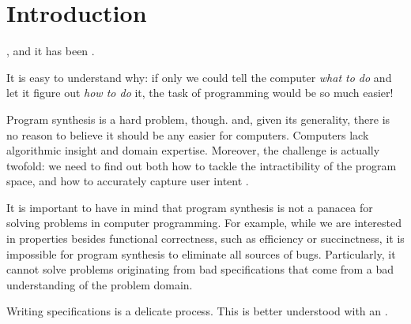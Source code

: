 \chapter{Introduction}
\label{chapter:introduction}


 , and it has been
.

It is easy to understand why: if only we could tell the computer \textit{what to
do} and let it figure out \textit{how to do} it, the task of programming would
be so much easier!

Program synthesis is a hard problem, though.  and, given its generality,
there is no reason to believe it should be any easier for computers. Computers
lack algorithmic insight and domain expertise. Moreover, the challenge is
actually twofold: we need to find out both how to tackle the intractibility of
the program space, and how to accurately capture user intent \cite{Gulwani2017}.


It is important to have in mind that program synthesis is not a panacea for
solving problems in computer programming. For example, while we are interested
in properties besides functional correctness, such as efficiency or
succinctness, it is impossible for program synthesis to eliminate all sources of
bugs. Particularly, it cannot solve problems originating from bad specifications
that come from a bad understanding of the problem domain.

Writing specifications is a delicate process. This is better understood with an
.


